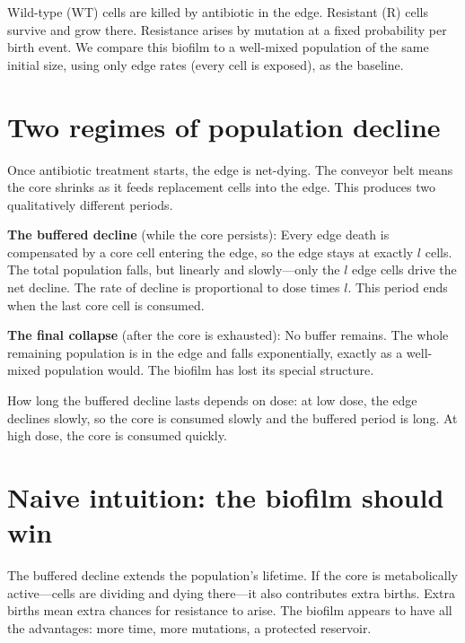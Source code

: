 \documentclass[12pt]{article}
\begin{document}
Wild-type (WT) cells are killed by antibiotic in the edge. Resistant (R)
cells survive and grow there. Resistance arises by mutation at a fixed
probability per birth event. We compare this biofilm to a well-mixed
population of the same initial size, using only edge rates (every cell is
exposed), as the baseline.

\section{Two regimes of population decline}

Once antibiotic treatment starts, the edge is net-dying. The conveyor belt
means the core shrinks as it feeds replacement cells into the edge. This
produces two qualitatively different periods.

\textbf{The buffered decline} (while the core persists): Every edge death
is compensated by a core cell entering the edge, so the edge stays at
exactly $l$ cells. The total population falls, but linearly and
slowly---only the $l$ edge cells drive the net decline. The rate of decline
is proportional to dose times $l$. This period ends when the last core cell
is consumed.

\textbf{The final collapse} (after the core is exhausted): No buffer
remains. The whole remaining population is in the edge and falls
exponentially, exactly as a well-mixed population would. The biofilm has
lost its special structure.

How long the buffered decline lasts depends on dose: at low dose, the edge
declines slowly, so the core is consumed slowly and the buffered period is
long. At high dose, the core is consumed quickly.

\section{Naive intuition: the biofilm should win}

The buffered decline extends the population's lifetime. If the core is
metabolically active---cells are dividing and dying there---it also
contributes extra births. Extra births mean extra chances for resistance
to arise. The biofilm appears to have all the advantages: more time, more
mutations, a protected reservoir.
\end{document}

